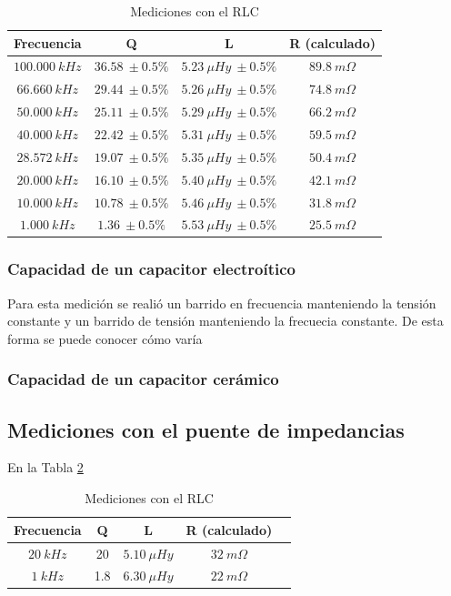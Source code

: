 \documentclass[a4paper,10pt]{article}
\begin{document}
		\begin{table}[!htp]
			\centering
			\begin{tabular}{|c|c|c|c|}
				\hline
				Frecuencia & Q & L  & R (calculado) \\
				\hline
				$100.000~kHz$& $36.58~\pm0.5\%$ & $5.23~\mu Hy~\pm0.5\%$ &$ 89.8~m\Omega$ \\
				\hline
				$66.660~kHz$& $29.44~\pm0.5\%$ & $5.26~\mu Hy~\pm0.5\%$ &$ 74.8~m\Omega$ \\
				\hline
				$50.000~kHz$& $25.11~\pm0.5\%$ & $5.29~\mu Hy~\pm0.5\%$ &$ 66.2~m\Omega$ \\
				\hline  
				$40.000~kHz$& $22.42~\pm0.5\%$ & $5.31~\mu Hy~\pm0.5\%$ &$ 59.5~m\Omega$ \\
				\hline  										
				$28.572~kHz$& $19.07~\pm0.5\%$ & $5.35~\mu Hy~\pm0.5\%$ &$ 50.4~m\Omega$ \\
				\hline
				$20.000~kHz$& $16.10~\pm0.5\%$ & $5.40~\mu Hy~\pm0.5\%$ &$ 42.1~m\Omega$ \\
				\hline  
				$10.000~kHz$& $10.78~\pm0.5\%$ & $5.46~\mu Hy~\pm0.5\%$ &$ 31.8~m\Omega$ \\
				\hline 										
				$1.000~kHz$& $1.36~\pm0.5\%$ & $5.53~\mu Hy~\pm0.5\%$ &$ 25.5~m\Omega$ \\
				\hline 	  
			\end{tabular}
			\caption{Mediciones con el RLC} \label{tabRLCbobina}
		\end{table}
				
		\subsubsection{Capacidad de un capacitor electro\'itico}	
		\indent Para esta medición se realió un barrido en frecuencia 
		manteniendo la tensión constante y un barrido de tensión manteniendo la
		frecuecia constante. De esta forma se puede conocer cómo varía 
		
		\subsubsection{Capacidad de un capacitor cer\'amico}
		
		\subsection{Mediciones con el puente de impedancias}
		En la Tabla \ref{tabPUENTEbobina}
		\begin{table}[!htp]
			\centering
			\begin{tabular}{|c|c|c|c|c|}
				\hline
				Frecuencia & Q & L  & R (calculado) \\
				\hline
				$20~kHz$& 20 & $5.10~\mu Hy$ &$ 32~m\Omega$ \\
				\hline
				$1~kHz$& 1.8 & $6.30~\mu Hy$ &$ 22~m\Omega$ \\
				\hline	  
			\end{tabular}
			\caption{Mediciones con el RLC} \label{tabPUENTEbobina}
		\end{table}	
\end{document}
